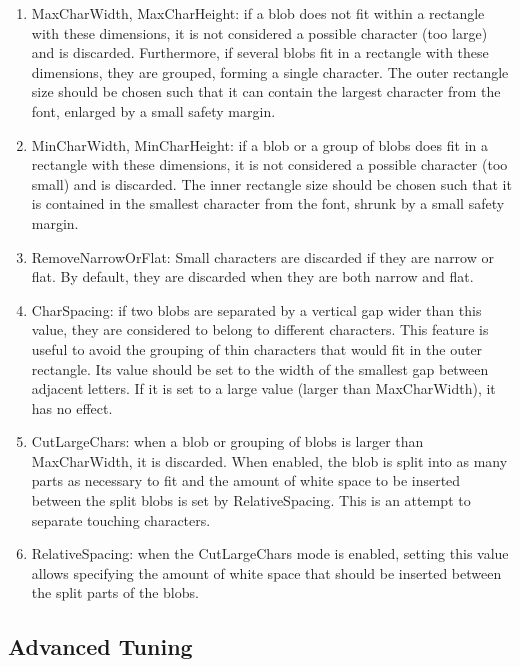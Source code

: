 \begin{enumerate}
	\item MaxCharWidth, MaxCharHeight: if a blob does not fit within a rectangle with these dimensions, it is not considered a possible character (too large) and is discarded. Furthermore, if several blobs fit in a rectangle with these dimensions, they are grouped, forming a single character. The outer rectangle size should be chosen such that it can contain the largest character from the font, enlarged by a small safety margin.
	\item MinCharWidth, MinCharHeight: if a blob or a group of blobs does fit in a rectangle with these dimensions, it is not considered a possible character (too small) and is discarded. The inner rectangle size should be chosen such that it is contained in the smallest character from the font, shrunk by a small safety margin.
	\item RemoveNarrowOrFlat: Small characters are discarded if they are narrow or flat. By default, they are discarded when they are both narrow and flat.
	\item CharSpacing: if two blobs are separated by a vertical gap wider than this value, they are considered to belong to different characters. This feature is useful to avoid the grouping of thin characters that would fit in the outer rectangle. Its value should be set to the width of the smallest gap between adjacent letters. If it is set to a large value (larger than MaxCharWidth), it has no effect.
	\item CutLargeChars: when a blob or grouping of blobs is larger than MaxCharWidth, it is discarded. When enabled, the blob is split into as many parts as necessary to fit and the amount of white space to be inserted between the split blobs is set by RelativeSpacing. This is an attempt to separate touching characters.
	\item RelativeSpacing: when the CutLargeChars mode is enabled, setting this value allows specifying the amount of white space that should be inserted between the split parts of the blobs.
\end{enumerate}
\subsection{Advanced Tuning}


